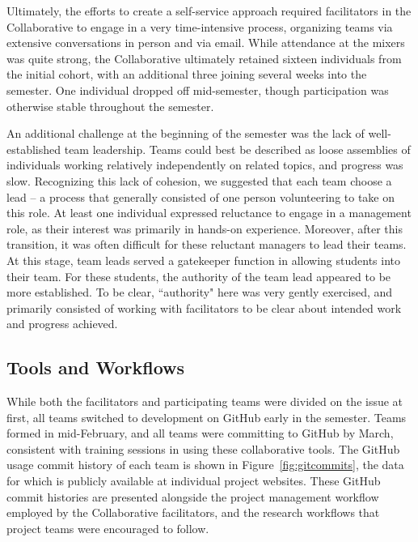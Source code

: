 \documentclass[12pt]{article}
\begin{document}
Ultimately, the efforts to create a self-service approach required facilitators in the Collaborative to engage in a very time-intensive process, organizing teams via extensive conversations in person and via email. While attendance at the mixers was quite strong, the Collaborative ultimately retained sixteen individuals from the initial cohort, with an additional three joining several weeks into the semester. One individual dropped off mid-semester, though participation was otherwise stable throughout the semester.

An additional challenge at the beginning of the semester was the lack of well-established team leadership. Teams could best be described as loose assemblies of individuals working relatively independently on related topics, and progress was slow. Recognizing this lack of cohesion, we suggested that each team choose a lead -- a process that generally consisted of one person volunteering to take on this role. At least one individual expressed reluctance to engage in a management role, as their interest was primarily in hands-on experience. Moreover, after this transition, it was often difficult for these reluctant managers to lead their teams.  At this stage, team leads served a gatekeeper function in allowing students into their team. For these students, the authority of the team lead appeared to be more established. To be clear, ``authority" here was very gently exercised, and primarily consisted of working with facilitators to be clear about intended work and progress achieved.

\subsection{Tools and Workflows}

While both the facilitators and participating teams were divided on the issue at first, all teams switched to development on GitHub early in the semester. Teams formed in mid-February, and all teams were committing to GitHub by March, consistent with training sessions in using these collaborative tools.  The GitHub usage commit history of each team is shown in Figure~\ref{fig:gitcommits}, the data for which is publicly available at individual project websites.  These GitHub commit histories are presented alongside the project management workflow employed by the Collaborative facilitators, and the research workflows that project teams were encouraged to follow.
\end{document}
